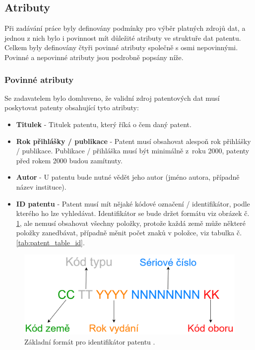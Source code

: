 \subsection{Atributy}\label{subsec:atributy}
Při zadávání práce byly definovány podmínky pro výběr platných zdrojů dat, a jednou z nich bylo i povinnost mít důležité atributy ve struktuře dat patentu. Celkem byly definovány čtyři povinné atributy společně s osmi nepovinnými. Povinné a nepovinné atributy jsou podrobně popsány níže.
\subsubsection{Povinné atributy}
Se zadavatelem bylo domluveno, že validní zdroj patentových dat musí poskytovat patenty obsahující tyto atributy:
\begin{itemize}
\item \textbf{Titulek} - Titulek patentu, který říká o čem daný patent.
\item \textbf{Rok přihlášky / publikace} - Patent musí obsahovat alespoň rok přihlášky / publikace. Publikace / přihláška musí být minimálně z~roku 2000, patenty před rokem 2000 budou zamítnuty.
\item \textbf{Autor} - U patentu bude nutné vědět jeho autor (jméno autora, případně název instituce).
\item \textbf{ID patentu} - Patent musí mít nějaké kódové označení / identifikátor, podle kterého ho lze vyhledávat. Identifikátor se bude držet formátu viz obrázek č. \ref{fig:patent_id}, ale nemusí obsahovat všechny položky, protože každá země může některé položky zanedbávat, případně měnit počet znaků v položce, viz tabulka č. \ref{tab:patent_table_id}.
\end{itemize}

	\begin{figure}[H]
	\centering
	\includegraphics[width=12cm]{img/patent_id}
	\caption{Základní formát pro identifikátor patentu \cite{patent_id_format}.}
	\label{fig:patent_id}
	\end{figure}

